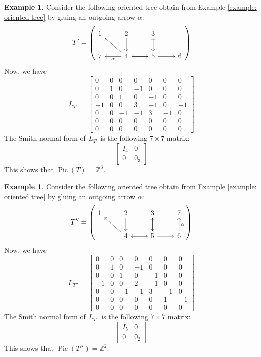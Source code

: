 \documentclass[11pt,reqno]{amsart}
\DeclareMathOperator{\Pic}{Pic}
\theoremstyle{definition}
\newtheorem{myeg}[mydef]{Example}
\theoremstyle{plain}
\begin{document}
\begin{myeg}
Consider the following oriented tree obtain from Example \ref{example: oriented tree} by gluing an outgoing arrow $\alpha$:
\[
T'=\left(\begin{tikzcd}
	1 	& 2 \arrow[d,swap] &  3 \arrow[d] & \\
	7& 4\arrow[r,swap] \arrow[ul] \arrow[l,"\alpha"] & 5 \arrow[l] \arrow[u]\arrow[r,swap] & 6
\end{tikzcd}\right)
\]
Now, we have
\[
L_{T'} = \begin{bmatrix}
	0&0 &0 &0 &0 &0 &0 \\
	0&1 &0 &-1 &0 &0 &0\\
	0& 0& 1&0 &-1 &0 &0\\
	-1& 0& 0& 3&-1 &0 &-1\\
	0&0 &-1 &-1 &3 &-1 &0\\
	0& 0&0 &0 &0 &0 & 0 \\
	0& 0&0 &0 &0 &0 & 0
\end{bmatrix}
\]
The Smith normal form of $L_{T'}$ is the following $7 \times 7$ matrix:
\[
\left[\begin{array}{c|c}
	I_4 & 0 \\ \hline
	0 & 0_3
\end{array}\right]
\]
This shows that $\Pic(T)=\mathbb{Z}^3$.
\end{myeg}

\begin{myeg}
Consider the following oriented tree obtain from Example \ref{example: oriented tree} by gluing an outgoing arrow $\alpha$:
\[
T''=\left(\begin{tikzcd}
	1
	& 2 \arrow[d,swap] &  3 \arrow[d] & 7\\
	& 4\arrow[r,swap] \arrow[ul] & 5 \arrow[l] \arrow[u]\arrow[r,swap] & 6 \arrow[u,swap,"\alpha"]
\end{tikzcd}\right)
\]
Now, we have
\[
L_{T''}=\begin{bmatrix}
	0&0 &0 &0 &0 &0 &0 \\
	0&1 &0 &-1 &0 &0 &0\\
	0& 0& 1&0 &-1 &0 &0\\
	-1& 0& 0& 2&-1 &0 &0\\
	0&0 &-1 &-1 &3 &-1 &0\\
	0& 0&0 &0 &0 &1 & -1 \\
	0& 0&0 &0 &0 &0 & 0
\end{bmatrix}
\]
The Smith normal form of $L_{T''}$ is the following $7 \times 7$ matrix:
\[
\left[\begin{array}{c|c}
	I_5 & 0  \\ \hline
	0 & 0_2
\end{array}\right]
\]
This shows that $\Pic(T'')=\mathbb{Z}^2$.
\end{myeg}
\end{document}
